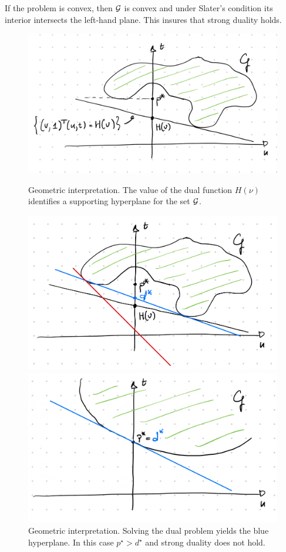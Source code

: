      If the problem is convex, then $\mathcal{G}$ is convex and under Slater's condition its interior intersects the left-hand plane. This insures that strong duality holds.
 
     \begin{figure}
         \centering
         \begin{minipage}{.48\textwidth}
             \centering
             \includegraphics[width=.8\textwidth]{images/geometric-primal-dual-1.png}
             \caption{Geometric interpretation. The value of the dual function $H(\nu)$ identifies a supporting hyperplane for the set $\mathcal{G}$.}
             \label{fig:geom1}
         \end{minipage}
         \hfill
         \begin{minipage}{.48\textwidth}
             \centering
             \includegraphics[width=.8\textwidth]{images/geometric-primal-dual-2.png}
             \caption{Geometric interpretation. Solving the dual problem yields the blue hyperplane. In this case $p^\star > d^\star$ and strong duality does not hold.}
             \label{fig:geom2}
         \end{minipage}
         \begin{minipage}{.48\textwidth}
             \centering
             \includegraphics[width=.8\textwidth]{images/geometric-primal-dual-3.png}

\end{minipage}
\end{figure}
